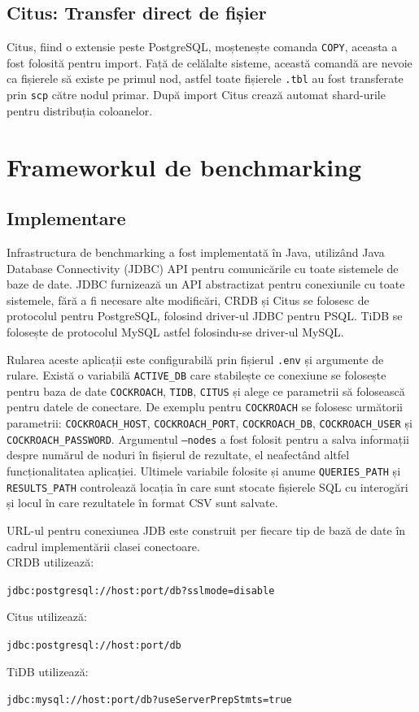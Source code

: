 \subsection{Citus: Transfer direct de fișier}

Citus, fiind o extensie peste PostgreSQL, moștenește comanda \texttt{COPY}, aceasta a fost folosită pentru import. Față de celălalte sisteme, această comandă are nevoie ca fișierele să existe pe primul nod, astfel toate fișierele \texttt{.tbl} au fost transferate prin \texttt{scp} către nodul primar. După import Citus crează automat shard-urile pentru distribuția coloanelor.

\section{Frameworkul de benchmarking}

\subsection{Implementare}

Infrastructura de benchmarking a fost implementată în Java, utilizând Java Database Connectivity (JDBC) API pentru comunicările cu toate sistemele de baze de date. JDBC furnizează un API abstractizat pentru conexiunile cu toate sistemele, fără a fi necesare alte modificări, CRDB și Citus se folosesc de protocolul pentru PostgreSQL, folosind driver-ul JDBC pentru PSQL. TiDB se folosește de protocolul MySQL astfel folosindu-se driver-ul MySQL.

Rularea aceste aplicații este configurabilă prin fișierul \texttt{.env} și argumente de rulare. Există o variabilă \texttt{ACTIVE\_DB} care stabilește ce conexiune se folosește pentru baza de date \texttt{COCKROACH}, \texttt{TIDB}, \texttt{CITUS} și alege ce parametrii să folosească pentru datele de conectare. De exemplu pentru \texttt{COCKROACH} se folosesc următorii parametrii: \texttt{COCKROACH\_HOST}, \texttt{COCKROACH\_PORT}, \texttt{COCKROACH\_DB}, \texttt{COCKROACH\_USER} și \texttt{COCKROACH\_PASSWORD}. Argumentul \texttt{--nodes} a fost folosit pentru a salva informații despre numărul de noduri în fișierul de rezultate, el neafectând altfel funcționalitatea aplicației. Ultimele variabile folosite și anume \texttt{QUERIES\_PATH} și \texttt{RESULTS\_PATH} controlează locația în care sunt stocate fișierele SQL cu interogări și locul în care rezultatele în format CSV sunt salvate.

URL-ul pentru conexiunea JDB este construit per fiecare tip de bază de date în cadrul implementării clasei conectoare.\\
CRDB utilizează: 
\begin{center}
    \texttt{jdbc:postgresql://host:port/db?sslmode=disable}
\end{center}
Citus utilizează:
\begin{center}
    \texttt{jdbc:postgresql://host:port/db}
\end{center}
TiDB utilizează:
\begin{center}
    \texttt{jdbc:mysql://host:port/db?useServerPrepStmts=true}
\end{center}


